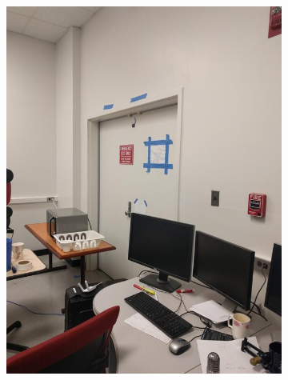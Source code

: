 \documentclass[12pt]{article}
\begin{document}
\begin{figure}[t!]
\begin{subfigure}[t]{0.1\textwidth}
        \includegraphics[width=\linewidth]{../Images/Set3/7}
    \end{subfigure}
    \begin{subfigure}[t]{0.1\textwidth}
        \centering

\end{subfigure}
\end{figure}
\end{document}
